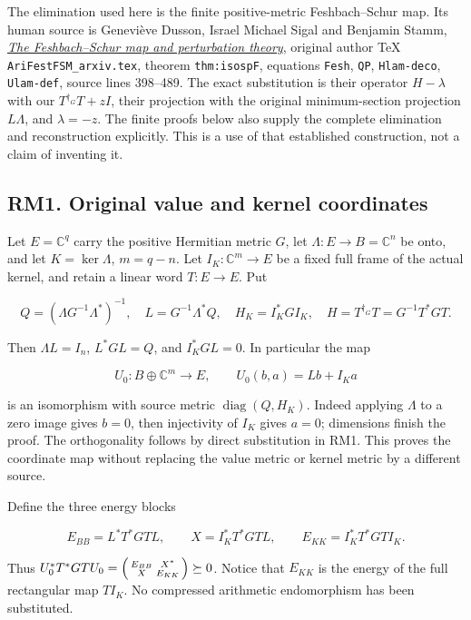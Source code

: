 \documentclass[11pt]{article}
\begin{document}
The elimination used here is the finite positive-metric Feshbach--Schur map. Its human source is Geneviève Dusson, Israel Michael Sigal and Benjamin Stamm, \href{https://arxiv.org/abs/2105.02058v1}{\emph{The Feshbach--Schur map and perturbation theory}}, original author TeX \texttt{AriFestFSM\_arxiv.tex}, theorem \texttt{thm:isospF}, equations \texttt{Fesh}, \texttt{QP}, \texttt{Hlam-deco}, \texttt{Ulam-def}, source lines 398--489. The exact substitution is their operator \(H-\lambda\) with our \(T^{\dagger_G}T+zI\), their projection with the original minimum-section projection \(L\Lambda\), and \(\lambda=-z\). The finite proofs below also supply the complete elimination and reconstruction explicitly. This is a use of that established construction, not a claim of inventing it.

\subsection{RM1. Original value and kernel coordinates}\label{rm1.-original-value-and-kernel-coordinates}

Let \(E=\mathbb C^q\) carry the positive Hermitian metric \(G\), let \(\Lambda:E\to B=\mathbb C^n\) be onto, and let \(K=\ker\Lambda\), \(m=q-n\). Let \(I_K:\mathbb C^m\to E\) be a fixed full frame of the actual kernel, and retain a linear word \(T:E\to E\). Put

\[
 Q=(\Lambda G^{-1}\Lambda^*)^{-1},\quad
 L=G^{-1}\Lambda^*Q,\quad H_K=I_K^*GI_K,\quad H=T^{\dagger_G}T=G^{-1}T^*GT.
 \tag{RM1}
\]

Then \(\Lambda L=I_n\), \(L^*GL=Q\), and \(I_K^*GL=0\). In particular the map

\[
 U_0:B\oplus\mathbb C^m\longrightarrow E,\qquad U_0(b,a)=Lb+I_Ka
 \tag{RM2}
\]

is an isomorphism with source metric \(\operatorname{diag}(Q,H_K)\). Indeed applying \(\Lambda\) to a zero image gives \(b=0\), then injectivity of \(I_K\) gives \(a=0\); dimensions finish the proof. The orthogonality follows by direct substitution in RM1. This proves the coordinate map without replacing the value metric or kernel metric by a different source.

Define the three energy blocks

\[
 E_{BB}=L^*T^*GTL,\qquad X=I_K^*T^*GTL,\qquad E_{KK}=I_K^*T^*GTI_K.
 \tag{RM3}
\]

Thus \(U_0^*T^*GTU_0=\begin{psmallmatrix}E_{BB}&X^*\\X&E_{KK}\end{psmallmatrix}\succeq0\). Notice that \(E_{KK}\) is the energy of the full rectangular map \(T I_K\). No compressed arithmetic endomorphism has been substituted.
\end{document}
